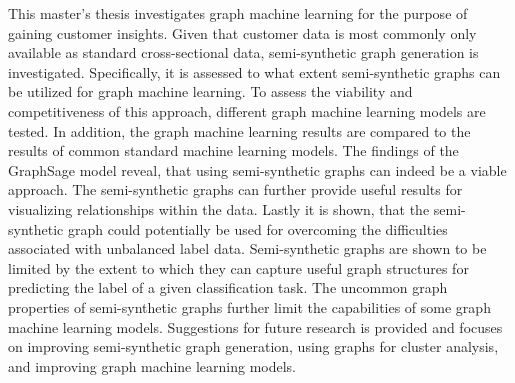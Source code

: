 
  \onehalfspacing

  This master's thesis investigates graph machine learning for the purpose of
  gaining customer insights. Given that customer data is most commonly only
  available as standard cross-sectional data, semi-synthetic graph generation is
  investigated. Specifically, it is assessed to what extent semi-synthetic graphs
  can be utilized for graph machine learning. To assess the viability and
  competitiveness of this approach, different graph machine learning models
  are tested. In addition, the graph machine learning results are compared to
  the results of common standard machine learning models. The findings of
  the GraphSage model reveal, that using semi-synthetic graphs can indeed be a
  viable approach. The semi-synthetic graphs can further provide useful results
  for visualizing relationships within the data. Lastly it is shown, that the
  semi-synthetic graph could potentially be used for overcoming the
  difficulties associated with unbalanced label data. Semi-synthetic graphs are 
  shown to be limited by the extent to which they can capture useful graph 
  structures for predicting the label of a given classification task. The
  uncommon graph properties of semi-synthetic graphs further limit the
  capabilities of some graph machine learning models. Suggestions for future 
  research is provided and focuses on improving semi-synthetic graph generation, 
  using graphs for cluster analysis, and improving graph machine learning models.
